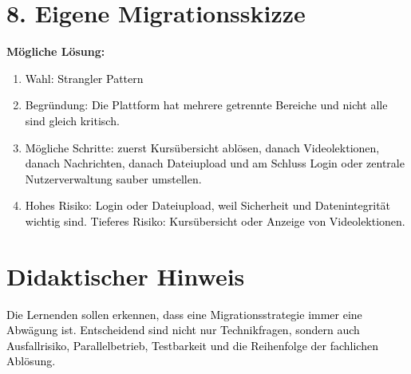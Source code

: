 \documentclass[11pt,a4paper]{article}
\newcommand{\solution}[1]{\textcolor{black}{#1}}
\begin{document}
\section*{8. Eigene Migrationsskizze}
\textbf{Mögliche Lösung:}
\begin{enumerate}
  \item \solution{Wahl: Strangler Pattern}
  \item \solution{Begründung: Die Plattform hat mehrere getrennte Bereiche und nicht alle sind gleich kritisch.}
  \item \solution{Mögliche Schritte: zuerst Kursübersicht ablösen, danach Videolektionen, danach Nachrichten, danach Dateiupload und am Schluss Login oder zentrale Nutzerverwaltung sauber umstellen.}
  \item \solution{Hohes Risiko: Login oder Dateiupload, weil Sicherheit und Datenintegrität wichtig sind. Tieferes Risiko: Kursübersicht oder Anzeige von Videolektionen.}
\end{enumerate}

\section*{Didaktischer Hinweis}
\solution{Die Lernenden sollen erkennen, dass eine Migrationsstrategie immer eine Abwägung ist. Entscheidend sind nicht nur Technikfragen, sondern auch Ausfallrisiko, Parallelbetrieb, Testbarkeit und die Reihenfolge der fachlichen Ablösung.}
\end{document}
